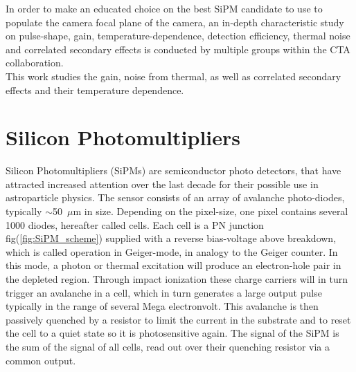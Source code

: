 \documentclass[12pt,article,type=msc,colorback,accentcolor=tud9c]{tudthesis}
\begin{document}
In order to make an educated choice on the best SiPM candidate to use to populate the camera focal plane of the camera, an in-depth characteristic study on pulse-shape, gain, temperature-dependence, detection efficiency, thermal noise and correlated secondary effects is conducted by multiple groups within the CTA collaboration.\\

This work studies the gain, noise from thermal, as well as correlated secondary effects and their temperature dependence. 





\clearpage
\section{\Large Silicon Photomultipliers}
\label{sec:SiPM}


Silicon Photomultipliers (SiPMs) are semiconductor photo detectors, that have attracted increased attention over the last decade for their possible use in astroparticle physics. The sensor consists of an array of avalanche photo-diodes, typically $\sim$50~$\mu$m in size. Depending on the pixel-size, one pixel contains several 1000 diodes, hereafter called cells. Each cell is a PN junction fig(\ref{fig:SiPM_scheme}) supplied with a reverse bias-voltage above breakdown, which is called operation in Geiger-mode, in analogy to the Geiger counter. In this mode, a photon or thermal excitation will produce an electron-hole pair in the depleted region. Through impact ionization these charge carriers will in turn trigger an avalanche in a cell, which in turn generates a large output pulse typically in the range of several Mega electronvolt. This avalanche is then passively quenched by a resistor to limit the current in the substrate and to reset the cell to a quiet state so it is photosensitive again. The signal of the SiPM is the sum of the signal of all cells, read out over their quenching resistor via a common output.\\
\end{document}
